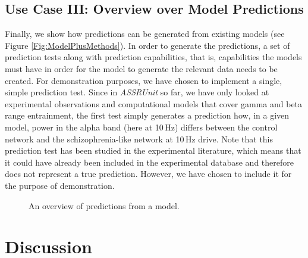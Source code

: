 \documentclass[a4paper,10pt]{article}
\begin{document}
\subsection{Use Case III: Overview over Model Predictions}
Finally, we show how predictions can be generated from existing models (see Figure \ref{Fig:ModelPlusMethods}). In order to generate the predictions, a set of prediction tests along with prediction capabilities, that is, 
capabilities the models must have 
in order for the model to generate the relevant data needs to be created. For demonstration purposes, we have chosen to implement a single, simple prediction test. Since in \textit{ASSRUnit} so far, we have only looked 
at experimental observations and computational models that cover gamma and beta range entrainment, the first test simply generates a prediction how, in a given model, power in the alpha band (here at 10\,Hz)
differs between the control network and the schizophrenia-like network at 10\,Hz drive.
Note that this prediction 
test has been studied in the experimental literature, which means that it could have already been included in the experimental database and therefore does not represent a true prediction.
However, we have chosen to include it for the purpose of demonstration. 
\begin{figure}
\label{Fig:Tests4040}
\caption{An overview of predictions from a model.}
\end{figure}

\FloatBarrier
\section{Discussion}
\end{document}
